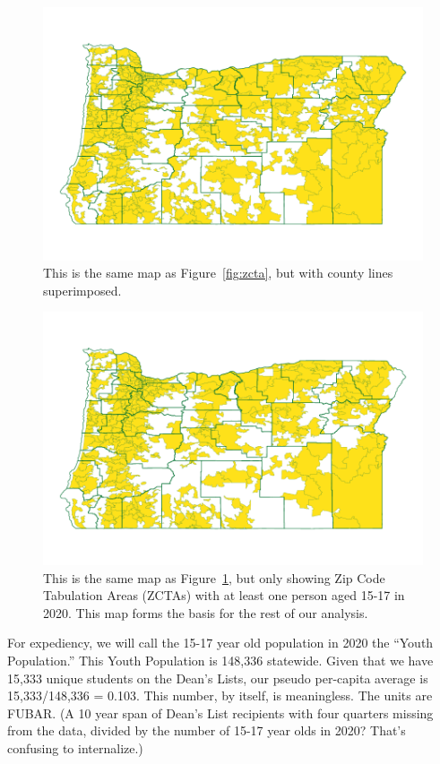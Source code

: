 \documentclass[10pt]{article}
\begin{document}
\begin{figure}[H]
	\centering
	\includegraphics[width=0.7\linewidth]{../visualizations/zcta-counties}
	\caption{This is the same map as Figure~\ref{fig:zcta}, but with county lines superimposed.}
	\label{fig:zcta-counties}
\end{figure}

\qquad

\begin{figure}[H]
	\centering
	\includegraphics[width=0.7\linewidth]{../visualizations/zcta-counties-youth}
	\caption{This is the same map as Figure~\ref{fig:zcta-counties}, but only showing Zip Code Tabulation Areas (ZCTAs) with at least one person aged 15-17 in 2020. This map forms the basis for the rest of our analysis.}
	\label{fig:zcta-counties-youth}
\end{figure}


\qquad

For expediency, we will call the 15-17 year old population in 2020 the ``Youth Population.'' This Youth Population is 148,336 statewide. Given that we have 15,333 unique students on the Dean's Lists, our pseudo per-capita average is 15,333/148,336 = 0.103. This number, by itself, is meaningless. The units are FUBAR. (A 10 year span of Dean's List recipients with four quarters missing from the data, divided by the number of 15-17 year olds in 2020? That's confusing to internalize.)
\end{document}
